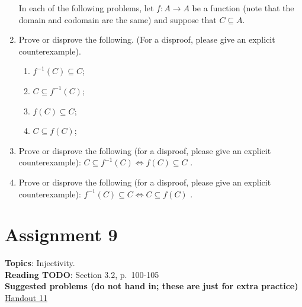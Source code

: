 \documentclass[12pt]{article}
\begin{document}
\begin{enumerate}
\newpage
\noindent In each of the following problems, let $f\colon A \to A$ be a function (note that the domain and codomain are the same) and suppose that $C \subseteq A$.
 
\item  Prove or disprove the following. (For a disproof, please give an explicit counterexample).
 \begin{enumerate}
 \item $f^{-1}(C)\subseteq  C$;
 \item $C\subseteq  f^{-1}(C)$;
 \item $f(C)\subseteq  C$;
 \item $C\subseteq  f(C)$;
 \end{enumerate}
 


\item Prove or disprove the following (for a disproof, please give an explicit counterexample): $C \subseteq  f^{-1}(C) \iff f(C)\subseteq  C$ . 

\item Prove or disprove the following (for a disproof, please give an explicit counterexample): $f^{-1}(C)\subseteq  C \iff C\subseteq  f(C)$ .
  
\end{enumerate}

\newpage
\section[9 (due \csname dateWeek9\endcsname): Injectivity.]{Assignment 9}

\textbf{Topics}: Injectivity.
\\

\noindent \textbf{Reading TODO}: Section 3.2, p.~100-105
\\

\noindent \textbf{Suggested problems (do not hand in; these are just for extra practice)}
\href{https://www.math.emory.edu/~dzb/teaching/250Fall2021/handouts/250-H11-injectivity.pdf}{Handout 11}
\\
\end{document}
